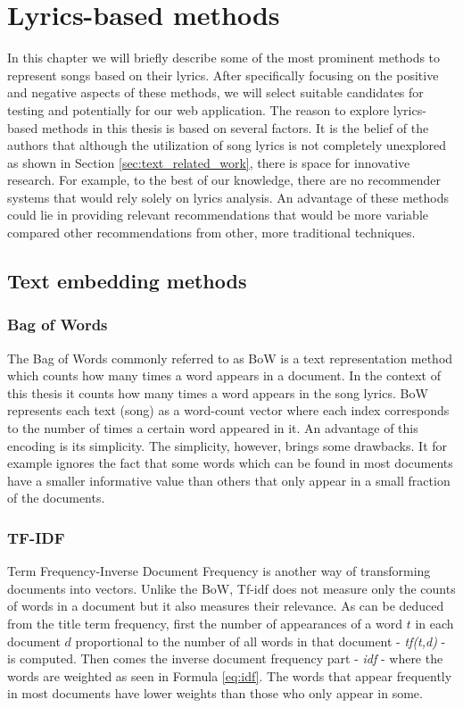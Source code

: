 \chapter{Lyrics-based methods}\label{chap:lyrics_methods}
 In this chapter we will briefly describe some of the most prominent methods to represent songs based on their lyrics. After specifically focusing on the positive and negative aspects of these methods, we will select suitable candidates for testing and potentially for our web application. The reason to explore lyrics-based methods in this thesis is based on several factors. It is the belief of the authors that although the utilization of song lyrics is not completely unexplored as shown in Section \ref{sec:text_related_work}, there is space for innovative research. For example, to the best of our knowledge, there are no recommender systems that would rely solely on lyrics analysis. An advantage of these methods could lie in providing relevant recommendations that would be more variable compared other recommendations from other, more traditional techniques.

\section{Text embedding methods}
\subsection{Bag of Words}
The Bag of Words commonly referred to as BoW is a text representation method which counts how many times a word appears in a document. In the context of this thesis it counts how many times a word appears in the song lyrics.
BoW represents each text (song) as a word-count vector where each index corresponds to the number of times a certain word appeared in it. An advantage of this encoding is its simplicity. The simplicity, however, brings some drawbacks. It for example ignores the fact that some words which can be found in most documents have a smaller informative value than others that only appear in a small fraction of the documents. 

\subsection{TF-IDF}
Term Frequency-Inverse Document Frequency is another way of transforming documents into vectors. Unlike the BoW, Tf-idf does not measure only the counts of words in a document but it also measures their relevance. As can be deduced from the title term frequency, first the number of appearances of a word $t$ in each document $d$ proportional to the number of all words in that document - \textit{tf(t,d)} - is computed. Then comes the inverse document frequency part - \textit{idf} - where the words are weighted as seen in Formula \ref{eq:idf}. The words that appear frequently in most documents have lower weights than those who only appear in some.

